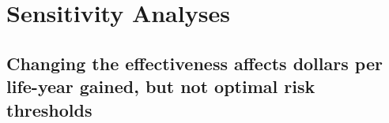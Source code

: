\documentclass[11pt, letterpaper]{article}
\begin{document}



% 
% 




\section{Sensitivity Analyses}

\subsection{Changing the effectiveness affects dollars per life-year gained, but not optimal risk thresholds}
\label{sec:40vs50}
\end{document}
